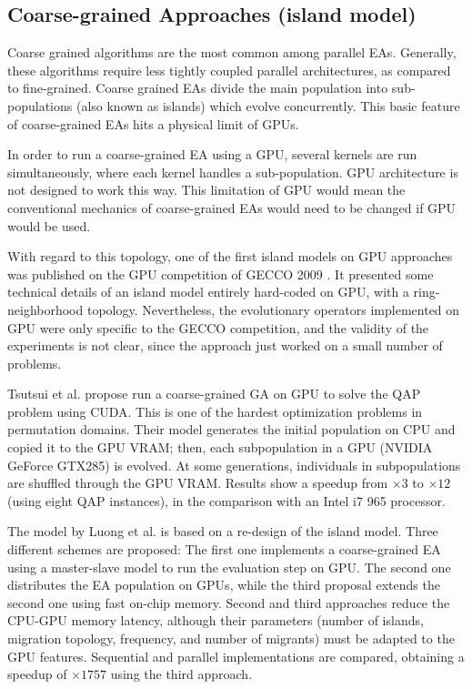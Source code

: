 \documentclass{comjnl}
\begin{document}
\subsection{Coarse-grained Approaches (island model)}

Coarse grained algorithms are the most common among parallel EAs. Generally, these algorithms require less tightly coupled parallel architectures, as compared to fine-grained. Coarse grained EAs divide the main population into sub-populations (also known as islands) which evolve concurrently. This basic feature of coarse-grained EAs hits a physical limit of GPUs. 

In order to run a coarse-grained EA using a GPU, several kernels are run simultaneously, where each kernel handles a sub-population. GPU architecture is not designed to work this way. This limitation of GPU would mean the conventional mechanics of coarse-grained EAs would need to be changed if GPU would be used.

With regard to this topology, one of the first island models on GPU approaches was published on the GPU competition of GECCO 2009 \cite{gecco2009CompetitionPospichal}. It presented some technical details of an island model entirely hard-coded on GPU, with a ring-neighborhood topology. Nevertheless, the evolutionary operators implemented on GPU were only specific to the GECCO competition, and the validity of the experiments is not clear, since the approach just worked on a small number of problems.

Tsutsui et al. \cite{1570355} propose run a coarse-grained GA on GPU to solve the QAP problem using CUDA. This is one of the hardest optimization problems in permutation domains. 
Their model generates the initial population on CPU and copied it to the GPU VRAM; then, each subpopulation in a GPU (NVIDIA GeForce GTX285) is evolved. At some generations, individuals in subpopulations are shuffled through the GPU VRAM. Results show a speedup from $\times3$ to $\times12$ (using eight QAP instances), in the comparison with an Intel i7 965 processor. 

The model by Luong et al. \cite{LUONG:2010:INRIA-00520464:1} is based on a re-design of the island model.
Three different schemes are proposed: The first one implements a coarse-grained EA using a master-slave model to run the evaluation step on GPU. The second one distributes the EA population on GPUs, while the third proposal extends the second one using fast on-chip memory. 
Second and third approaches reduce the CPU-GPU memory latency, although their parameters (number of islands, migration topology, frequency, and number of migrants) must be adapted to the GPU features. 
Sequential and parallel implementations are compared, obtaining a speedup of $\times1757$ using the third approach.
\end{document}
